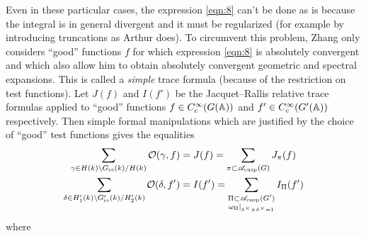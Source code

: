 Even in these particular cases, the expression \eqref{eqn:8} can't be done as is because the integral is in general divergent and it must be regularized (for example by introducing truncations as Arthur does).
To circumvent this problem, Zhang only considers ``good'' functions $f$ for which expression \eqref{eqn:8} is absolutely convergent and which also allow him to obtain absolutely convergent geometric and spectral expansions.
This is called a \emph{simple} trace formula (because of the restriction on test functions).
Let $J(f)$ and $I(f')$ be the Jacquet--Rallis relative trace formulas applied to ``good'' functions $f \in C_c^\infty(G(\mathbb{A}))$ and $f' \in C_c^\infty(G'(\mathbb{A}))$ respectively.
Then simple formal manipulations which are justified by the choice of ``good'' test functions gives the equalities
\begin{align}
    \sum_{\gamma \in H(k) \backslash G_{\mathrm{rs}}(k) / H(k)}  \mathcal{O}(\gamma, f) &= J(f) = \sum_{\pi \subset \mathscr{A}_{\mathrm{cusp}}(G)} J_\pi(f) \label{eqn:9} \\
    \sum_{\delta \in H_1'(k) \backslash G_{\mathrm{rs}}'(k) / H_2'(k)} \mathcal{O}(\delta, f') &=  I(f') = \sum_{\substack{\Pi \subset \mathscr{A}_{\mathrm{cusp}}(G') \\ \omega_\Pi|_{\mathbb{A}^\times \times \mathbb{A}^\times = 1}}} I_\Pi(f') \label{eqn:10}
\end{align}
where
